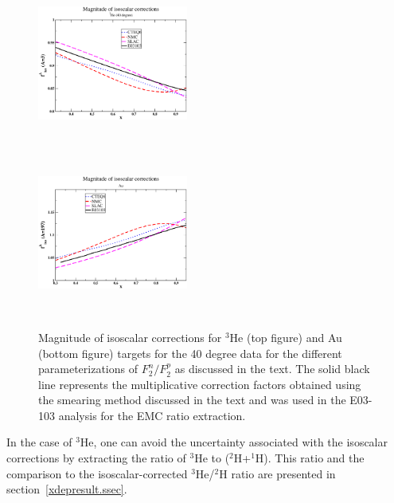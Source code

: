 \begin{figure}[htbp]  
\includegraphics[height=55mm,width=0.44\textwidth,clip]{plots/f2nf2p_size_he3.eps} \\
\includegraphics[height=55mm,width=0.44\textwidth,clip]{plots/f2nf2p_size_au.eps}
\caption{Magnitude of isoscalar corrections for $^3$He (top figure) and Au
(bottom figure) targets for the 40 degree data for the different
parameterizations of $F_2^n/F_2^p$ as discussed in the text. The solid black
line represents the multiplicative correction factors obtained using the
smearing method discussed in the text and was used in the E03-103 analysis
for the EMC ratio extraction.
\label{f2nf2psize_fig}}
\end{figure}

In the case of $^3$He, one can avoid the uncertainty associated with the
isoscalar corrections by extracting the ratio of $^3$He to ($^2$H+$^1$H).
This ratio and the comparison to the isoscalar-corrected $^3$He/$^2$H ratio
are presented in section~\ref{xdepresult.ssec}.


